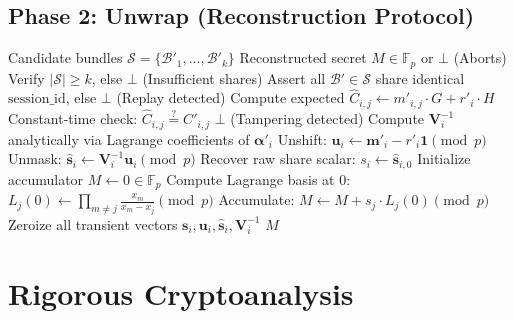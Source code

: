 \documentclass[10pt,journal,compsoc]{IEEEtran}
\begin{document}
\subsection{Phase 2: Unwrap (Reconstruction Protocol)}
\begin{algorithm}[H]
\caption{TCW-Mask Reconstruct ($\text{Unwrap}$)}
\begin{algorithmic}[1]
\Require Candidate bundles $\mathcal{S} = \{\mathcal{B}'_1, \dots, \mathcal{B}'_k\}$
\Ensure Reconstructed secret $M \in \mathbb{F}_p$ or $\bot$ (Aborts)
\State Verify $|\mathcal{S}| \ge k$, else \Return $\bot$ (Insufficient shares)
\State Assert all $\mathcal{B}' \in \mathcal{S}$ share identical $\text{session\_id}$, else \Return $\bot$ (Replay detected)
        \State Compute expected $\hat{C}_{i, j} \gets m'_{i, j} \cdot G + r'_i \cdot H$
        \State Constant-time check: $\hat{C}_{i, j} \stackrel{?}{=} C'_{i, j}$
            \State \Return $\bot$ (Tampering detected)
        \EndIf
    \EndFor
    \State Compute $\mathbf{V}_i^{-1}$ analytically via Lagrange coefficients of $\boldsymbol{\alpha}'_i$
    \State Unshift: $\mathbf{u}_i \gets \mathbf{m}'_i - r'_i \mathbf{1} \pmod p$
    \State Unmask: $\hat{\mathbf{s}}_i \gets \mathbf{V}_i^{-1} \mathbf{u}_i \pmod p$
    \State Recover raw share scalar: $s_i \gets \hat{\mathbf{s}}_{i, 0}$
\EndFor
\State Initialize accumulator $M \gets 0 \in \mathbb{F}_p$
    \State Compute Lagrange basis at 0: $L_j(0) \gets \prod_{m \ne j} \frac{x_m}{x_m - x_j} \pmod p$
    \State Accumulate: $M \gets M + s_j \cdot L_j(0) \pmod p$
\EndFor
\State Zeroize all transient vectors $\mathbf{s}_i, \mathbf{u}_i, \hat{\mathbf{s}}_i, \mathbf{V}_i^{-1}$
\State \Return $M$
\end{algorithmic}
\end{algorithm}

\section{Rigorous Cryptoanalysis}
\end{document}
